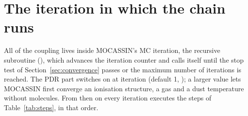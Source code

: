 \section{The iteration in which the chain runs}
\label{sec:iteration}

All of the coupling lives inside MOCASSIN's MC iteration, the recursive
subroutine  (), which
advances the iteration counter and calls itself until the stop test of
Section~\ref{sec:convergence} passes or the maximum number of iterations is
reached. The PDR part switches on at iteration  (default 1,
); a larger value lets MOCASSIN first converge an
ionisation structure, a gas and a dust temperature without molecules. From
then on every iteration executes the steps of Table~\ref{tab:steps}, in that
order.

